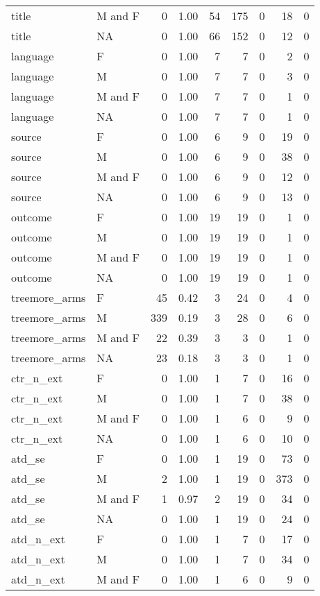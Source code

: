 \documentclass[
]{article}
\begin{document}
\begin{longtable}[]{@{}llrrrrrrr@{}}
title & M and F & 0 & 1.00 & 54 & 175 & 0 & 18 & 0 \\
title & NA & 0 & 1.00 & 66 & 152 & 0 & 12 & 0 \\
language & F & 0 & 1.00 & 7 & 7 & 0 & 2 & 0 \\
language & M & 0 & 1.00 & 7 & 7 & 0 & 3 & 0 \\
language & M and F & 0 & 1.00 & 7 & 7 & 0 & 1 & 0 \\
language & NA & 0 & 1.00 & 7 & 7 & 0 & 1 & 0 \\
source & F & 0 & 1.00 & 6 & 9 & 0 & 19 & 0 \\
source & M & 0 & 1.00 & 6 & 9 & 0 & 38 & 0 \\
source & M and F & 0 & 1.00 & 6 & 9 & 0 & 12 & 0 \\
source & NA & 0 & 1.00 & 6 & 9 & 0 & 13 & 0 \\
outcome & F & 0 & 1.00 & 19 & 19 & 0 & 1 & 0 \\
outcome & M & 0 & 1.00 & 19 & 19 & 0 & 1 & 0 \\
outcome & M and F & 0 & 1.00 & 19 & 19 & 0 & 1 & 0 \\
outcome & NA & 0 & 1.00 & 19 & 19 & 0 & 1 & 0 \\
treemore\_arms & F & 45 & 0.42 & 3 & 24 & 0 & 4 & 0 \\
treemore\_arms & M & 339 & 0.19 & 3 & 28 & 0 & 6 & 0 \\
treemore\_arms & M and F & 22 & 0.39 & 3 & 3 & 0 & 1 & 0 \\
treemore\_arms & NA & 23 & 0.18 & 3 & 3 & 0 & 1 & 0 \\
ctr\_n\_ext & F & 0 & 1.00 & 1 & 7 & 0 & 16 & 0 \\
ctr\_n\_ext & M & 0 & 1.00 & 1 & 7 & 0 & 38 & 0 \\
ctr\_n\_ext & M and F & 0 & 1.00 & 1 & 6 & 0 & 9 & 0 \\
ctr\_n\_ext & NA & 0 & 1.00 & 1 & 6 & 0 & 10 & 0 \\
atd\_se & F & 0 & 1.00 & 1 & 19 & 0 & 73 & 0 \\
atd\_se & M & 2 & 1.00 & 1 & 19 & 0 & 373 & 0 \\
atd\_se & M and F & 1 & 0.97 & 2 & 19 & 0 & 34 & 0 \\
atd\_se & NA & 0 & 1.00 & 1 & 19 & 0 & 24 & 0 \\
atd\_n\_ext & F & 0 & 1.00 & 1 & 7 & 0 & 17 & 0 \\
atd\_n\_ext & M & 0 & 1.00 & 1 & 7 & 0 & 34 & 0 \\
atd\_n\_ext & M and F & 0 & 1.00 & 1 & 6 & 0 & 9 & 0 \\

\end{longtable}
\end{document}
